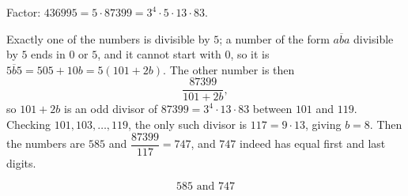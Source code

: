 Factor: \(436995=5\cdot87399=3^4\cdot5\cdot13\cdot83\).

Exactly one of the numbers is divisible by \(5\); a number of the form \(\overline{aba}\) divisible by \(5\) ends in \(0\) or \(5\), and it cannot start with \(0\), so it is \(\overline{5b5}=505+10b=5(101+2b)\). The other number is then
\[
\dfrac{87399}{101+2b},
\]
so \(101+2b\) is an odd divisor of \(87399=3^4\cdot13\cdot83\) between \(101\) and \(119\). Checking \(101,103,\dots,119\), the only such divisor is \(117=9\cdot13\), giving \(b=8\). Then the numbers are \(585\) and \(\dfrac{87399}{117}=747\), and \(747\) indeed has equal first and last digits.

\[
\boxed{585\text{ and }747}
\]
